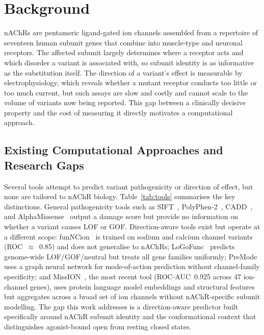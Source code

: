 \documentclass{ws-procs11x85}
\begin{document}
\section{Background}\label{sec:background}
nAChRs are pentameric ligand-gated ion channels assembled from a
repertoire of seventeen human subunit genes that combine into muscle-type
and neuronal receptors. The affected subunit largely determines where a
receptor acts and which disorder a variant is associated with, so
subunit identity is as informative as the substitution itself. The
direction of a variant's effect is measurable by electrophysiology, which
reveals whether a mutant receptor conducts too little or too much current,
but such assays are slow and costly and cannot scale to the volume of
variants now being reported. This gap between a clinically decisive
property and the cost of measuring it directly motivates a computational
approach.

\subsection{Existing Computational Approaches and Research Gaps}

Several tools attempt to predict variant pathogenicity or direction of
effect, but none are tailored to nAChR biology.
Table~\ref{tab:tools} summarises the key distinctions.
General pathogenicity tools such as SIFT~\cite{sift},
PolyPhen-2~\cite{polyphen2}, CADD~\cite{cadd}, and
AlphaMissense~\cite{alphamissense} output a damage score but provide no
information on whether a variant causes LOF or GOF.
Direction-aware tools exist but operate at a different scope:
funNCion~\cite{funncion} is trained on sodium and calcium channel
variants (ROC~$\approx$~0.85) and does not generalise to nAChRs;
LoGoFunc~\cite{logofunc} predicts genome-wide LOF/GOF/neutral but
treats all gene families uniformly; PreMode~\cite{premode} uses a graph
neural network for mode-of-action prediction without channel-family
specificity; and MissION~\cite{mission}, the most recent tool
(ROC-AUC~0.925 across 47 ion-channel genes), uses protein language
model embeddings and structural features but aggregates across a broad
set of ion channels without nAChR-specific subunit modelling.
The gap this work addresses is a direction-aware predictor built
specifically around nAChR subunit identity and the conformational
context that distinguishes agonist-bound open from resting closed states.
\end{document}

